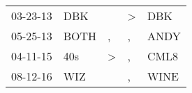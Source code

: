 \begin{supertabular}{p{0.07\textwidth}p{0.06\textwidth}p{0.02\textwidth}p{0.02\textwidth}p{0.06\textwidth}}
 03-23-13\textsuperscript{} &   DBK\textsuperscript{} &               &  \textgreater &   DBK\textsuperscript{} \\
 05-25-13\textsuperscript{} &  BOTH\textsuperscript{} &             , &             , &  ANDY\textsuperscript{} \\
 04-11-15\textsuperscript{} &   40s\textsuperscript{} &  \textgreater &             , &  CML8\textsuperscript{} \\
 08-12-16\textsuperscript{} &   WIZ\textsuperscript{} &               &             , &  WINE\textsuperscript{} \\
\end{supertabular}

